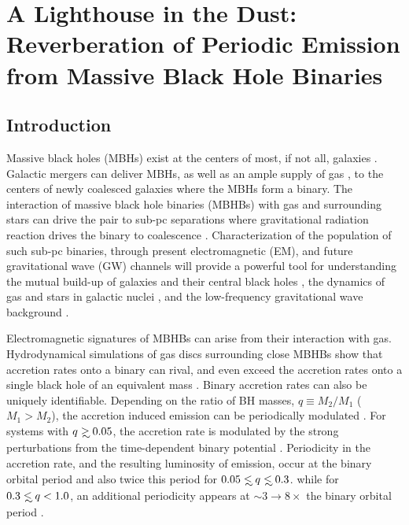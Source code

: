 \chapter[A Lighthouse in the Dust]{A Lighthouse in the Dust: Reverberation of Periodic Emission from Massive Black Hole Binaries}
\label{ch:Dust}
\let\thefootnote\relax{}





\section{Introduction} 

Massive black holes (MBHs) exist at the centers of most, if not all, galaxies
\citep{kr95, KormendyHo2013}. Galactic mergers can deliver MBHs, as well as an
ample supply of gas \citep{BH1992, Barnes:1996, Barnes:2002,
Mayer:2013:MBHBGasRev}, to the centers of newly coalesced galaxies where the
MBHs form a binary. The interaction of massive black hole binaries (MBHBs)
with gas and surrounding stars can drive the pair to sub-pc separations where
gravitational radiation reaction drives the binary to coalescence
\citep{Begel:Blan:Rees:1980}.  Characterization of the population of such sub-pc 
binaries, through present electromagnetic (EM), and future gravitational
wave (GW) channels will provide a powerful tool for understanding the mutual
build-up of galaxies and their central black holes
\citep[\textit{e.g.}][]{KormendyHo2013}, the dynamics of gas and stars in
galactic nuclei \citep[\textit{e.g.}][]{MerrittMilos:2005:LRR}, and the low-frequency 
gravitational wave background \citep[\textit{e.g.}][]{KocsisSesana:2011, Shannon:2015,
Arzoumanian:2015:SGWB}.

Electromagnetic signatures of MBHBs can arise from their interaction with gas.
Hydrodynamical simulations of gas discs surrounding close MBHBs show that
accretion rates onto a binary can rival, and even exceed the accretion rates
onto a single black hole of an equivalent mass \citep{ShiKrolik:2012,
DHM:2013:MNRAS, Farris:2014, ShiKrolik:2015, MunozLai:2016}. Binary accretion
rates can also be uniquely identifiable. Depending on the ratio of BH masses,
$q \equiv M_2/M_1$ ($M_1>M_2$), the accretion induced emission can be
periodically modulated \citep{Farris:2015:Cool}. For systems with $q \gsim
0.05$, the accretion rate is modulated by the strong perturbations from the
time-dependent binary potential \citep{D'Orazio:CBDTrans:2016}. Periodicity in
the accretion rate, and the resulting luminosity of emission, occur at the
binary orbital period and also twice this period for $0.05 \lsim q \lsim 0.3$.
while for $0.3 \lsim q < 1.0$, an additional periodicity appears at $\sim3
\rightarrow 8\times$ the binary orbital period \citep{ShiKrolik:2012,
DHM:2013:MNRAS, Farris:2014, ShiKrolik:2015, MunozLai:2016}.

